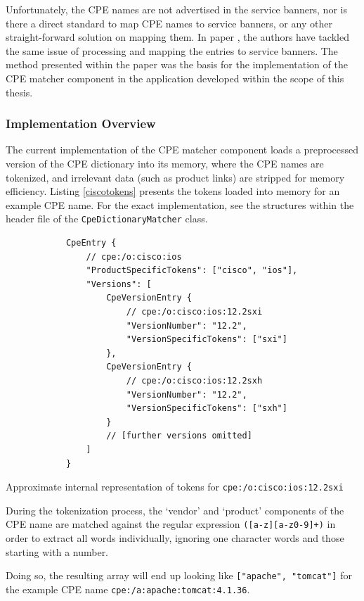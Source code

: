 \documentclass[a4paper,12pt]{article}
\begin{document}
	Unfortunately, the CPE names are not advertised in the service banners, nor is there a direct standard to map CPE names to service banners, or any other straight-forward solution on mapping them. In paper \cite{shovat15}, the authors have tackled the same issue of processing and mapping the entries to service banners. The method presented within the paper was the basis for the implementation of the CPE matcher component in the application developed within the scope of this thesis.
	
\subsubsection{Implementation Overview}
 
	
	The current implementation of the CPE matcher component loads a preprocessed version of the CPE dictionary into its memory, where the CPE names are tokenized, and irrelevant data (such as product links) are stripped for memory efficiency. Listing \ref{ciscotokens} presents the tokens loaded into memory for an example CPE name. For the exact implementation, see the structures within the header file of the \texttt{CpeDictionaryMatcher} class.
	
	\begin{listing}[H]
		\begin{verbatim}
			CpeEntry {
				// cpe:/o:cisco:ios
				"ProductSpecificTokens": ["cisco", "ios"],
				"Versions": [
					CpeVersionEntry {
						// cpe:/o:cisco:ios:12.2sxi
						"VersionNumber": "12.2",
						"VersionSpecificTokens": ["sxi"]
					},
					CpeVersionEntry {
						// cpe:/o:cisco:ios:12.2sxh
						"VersionNumber": "12.2",
						"VersionSpecificTokens": ["sxh"]
					}
					// [further versions omitted]
				]
			}
		\end{verbatim}
		\caption{Approximate internal representation of tokens for \texttt{cpe:/o:cisco:ios:12.2sxi}}
		\label{ciscotokens}
	\end{listing}
	
	During the tokenization process, the `vendor' and `product' components of the CPE name are matched against the regular expression \texttt{([a-z][a-z0-9]+)} in order to extract all words individually, ignoring one character words and those starting with a number.
	
	Doing so, the resulting array will end up looking like \texttt{["apache", "tomcat"]} for the example CPE name \texttt{cpe:/a:apache:tomcat:4.1.36}.
	
\end{document}
